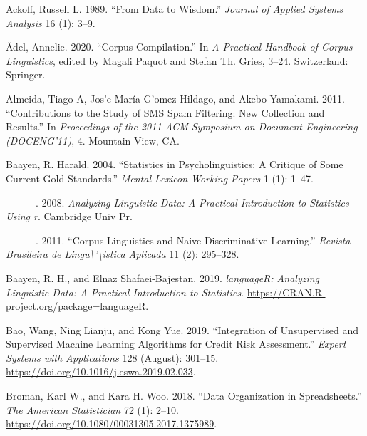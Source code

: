 \documentclass[
  letterpaper,
]{latex/krantz}
\newlength{\cslhangindent}
\newlength{\cslentryspacingunit} %
\newenvironment{CSLReferences}[2] %
 {%
  \setlength{\parindent}{0pt}
  \ifodd #1
  \let\oldpar\par
  \def\par{\hangindent=\cslhangindent\oldpar}
  \fi
  \setlength{\parskip}{#2\cslentryspacingunit}
 }%
 {}
\begin{document}
\hypertarget{refs}{}
\begin{CSLReferences}{1}{0}
\leavevmode{}%
Ackoff, Russell L. 1989. {``From Data to Wisdom.''} \emph{Journal of
Applied Systems Analysis} 16 (1): 3--9.

\leavevmode{}%
Ädel, Annelie. 2020. {``Corpus Compilation.''} In \emph{A Practical
Handbook of Corpus Linguistics}, edited by Magali Paquot and Stefan Th.
Gries, 3--24. Switzerland: Springer.

\leavevmode{}%
Almeida, Tiago A, Jos'e María G'omez Hildago, and Akebo Yamakami. 2011.
{``Contributions to the Study of SMS Spam Filtering: New Collection and
Results.''} In \emph{Proceedings of the 2011 ACM Symposium on Document
Engineering (DOCENG'11)}, 4. Mountain View, CA.

\leavevmode{}%
Baayen, R. Harald. 2004. {``Statistics in Psycholinguistics: A Critique
of Some Current Gold Standards.''} \emph{Mental Lexicon Working Papers}
1 (1): 1--47.

\leavevmode{}%
---------. 2008. \emph{Analyzing Linguistic Data: A Practical
Introduction to Statistics Using r}. Cambridge Univ Pr.

\leavevmode{}%
---------. 2011. {``Corpus Linguistics and Naive Discriminative
Learning.''} \emph{Revista Brasileira de
Lingu\textbackslash'\textbackslash istica Aplicada} 11 (2): 295--328.

\leavevmode{}%
Baayen, R. H., and Elnaz Shafaei-Bajestan. 2019. \emph{languageR:
Analyzing Linguistic Data: A Practical Introduction to Statistics}.
\url{https://CRAN.R-project.org/package=languageR}.

\leavevmode{}%
Bao, Wang, Ning Lianju, and Kong Yue. 2019. {``Integration of
Unsupervised and Supervised Machine Learning Algorithms for Credit Risk
Assessment.''} \emph{Expert Systems with Applications} 128 (August):
301--15. \url{https://doi.org/10.1016/j.eswa.2019.02.033}.

\leavevmode{}%
Broman, Karl W., and Kara H. Woo. 2018. {``Data Organization in
Spreadsheets.''} \emph{The American Statistician} 72 (1): 2--10.
\url{https://doi.org/10.1080/00031305.2017.1375989}.


\end{CSLReferences}
\end{document}
